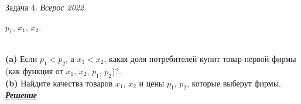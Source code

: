 \begin{mybox}{Задача 4. \textit{Всерос 2022}}
\begin{enumerate}
        $p_1$, $x_1$, $x_2$.
    \end{enumerate}\smallskip\\
    \indent\setlength{\parindent}{1em}\indent\setlength{\parindent}{1em}\textbf{(a)} Если $p_1<p_2$, а $x_1<x_2$, какая доля потребителей купит товар
    первой фирмы (как функция от $x_1$, $x_2$, $p_1$, $p_2$)?.\smallskip\\
    \indent\setlength{\parindent}{1em}\textbf{(b)} Найдите качества товаров $x_1$, $x_2$ и цены $p_1$, $p_2$, которые
    выберут фирмы.\bigskip\\
    \textit{\textbf{\centering\href{https://iloveeconomics.ru/sites/default/files/olimp/vseros/2022/vseros_2022_solutions_10_23379.pdf}{Решение}}}
\end{mybox}

